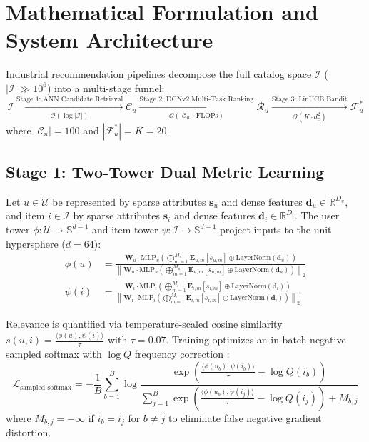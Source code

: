 \section{Mathematical Formulation and System Architecture}
\label{sec:architecture}

Industrial recommendation pipelines decompose the full catalog space $\mathcal{I}$ ($|\mathcal{I}| \gg 10^6$) into a multi-stage funnel:
\begin{equation}
\mathcal{I} \xrightarrow[\mathcal{O}(\log |\mathcal{I}|)]{\text{Stage 1: ANN Candidate Retrieval}} \mathcal{C}_u \xrightarrow[\mathcal{O}(|\mathcal{C}_u| \cdot \text{FLOPs})]{\text{Stage 2: DCNv2 Multi-Task Ranking}} \mathcal{R}_u \xrightarrow[\mathcal{O}(K \cdot d_c^2)]{\text{Stage 3: LinUCB Bandit}} \mathcal{F}_u^*
\end{equation}
where $|\mathcal{C}_u| = 100$ and $|\mathcal{F}_u^*| = K = 20$.

\subsection{Stage 1: Two-Tower Dual Metric Learning}
Let $u \in \mathcal{U}$ be represented by sparse attributes $\mathbf{s}_u$ and dense features $\mathbf{d}_u \in \mathbb{R}^{D_u}$, and item $i \in \mathcal{I}$ by sparse attributes $\mathbf{s}_i$ and dense features $\mathbf{d}_i \in \mathbb{R}^{D_i}$. The user tower $\phi: \mathcal{U} \to \mathbb{S}^{d-1}$ and item tower $\psi: \mathcal{I} \to \mathbb{S}^{d-1}$ project inputs to the unit hypersphere ($d = 64$):
\begin{align}
\phi(u) &= \frac{\mathbf{W}_u \cdot \text{MLP}_u\left( \bigoplus_{m=1}^{M_u} \mathbf{E}_{u,m}[s_{u,m}] \oplus \text{LayerNorm}(\mathbf{d}_u) \right)}{\left\| \mathbf{W}_u \cdot \text{MLP}_u\left( \bigoplus_{m=1}^{M_u} \mathbf{E}_{u,m}[s_{u,m}] \oplus \text{LayerNorm}(\mathbf{d}_u) \right) \right\|_2} \\
\psi(i) &= \frac{\mathbf{W}_i \cdot \text{MLP}_i\left( \bigoplus_{m=1}^{M_i} \mathbf{E}_{i,m}[s_{i,m}] \oplus \text{LayerNorm}(\mathbf{d}_i) \right)}{\left\| \mathbf{W}_i \cdot \text{MLP}_i\left( \bigoplus_{m=1}^{M_i} \mathbf{E}_{i,m}[s_{i,m}] \oplus \text{LayerNorm}(\mathbf{d}_i) \right) \right\|_2}
\end{align}

Relevance is quantified via temperature-scaled cosine similarity $s(u, i) = \frac{\langle \phi(u), \psi(i) \rangle}{\tau}$ with $\tau = 0.07$. Training optimizes an in-batch negative sampled softmax with $\log Q$ frequency correction \cite{yi2019sampling}:
\begin{equation}
\mathcal{L}_{\text{sampled-softmax}} = - \frac{1}{B} \sum_{b=1}^B \log \frac{\exp\left( \frac{\langle \phi(u_b), \psi(i_b) \rangle}{\tau} - \log Q(i_b) \right)}{\sum_{j=1}^B \exp\left( \frac{\langle \phi(u_b), \psi(i_j) \rangle}{\tau} - \log Q(i_j) \right) + M_{b,j}}
\end{equation}
where $M_{b,j} = -\infty$ if $i_b = i_j$ for $b \neq j$ to eliminate false negative gradient distortion.


